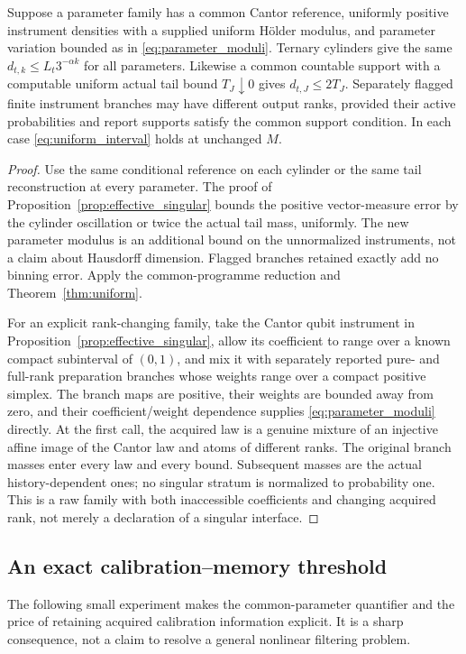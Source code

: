 \begin{corollary}\label{cor:uniform_singular}
Suppose a parameter family has a common Cantor reference, uniformly positive instrument densities with a supplied uniform H\"older modulus, and parameter variation bounded as in \eqref{eq:parameter_moduli}. Ternary cylinders give the same $d_{t,k}\le L_t3^{-\alpha k}$ for all parameters. Likewise a common countable support with a computable uniform actual tail bound $T_J\downarrow0$ gives $d_{t,J}\le2T_J$. Separately flagged finite instrument branches may have different output ranks, provided their active probabilities and report supports satisfy the common support condition. In each case \eqref{eq:uniform_interval} holds at unchanged $M$.
\end{corollary}
\begin{proof}
Use the same conditional reference on each cylinder or the same tail reconstruction at every parameter. The proof of Proposition~\ref{prop:effective_singular} bounds the positive vector-measure error by the cylinder oscillation or twice the actual tail mass, uniformly. The new parameter modulus is an additional bound on the unnormalized instruments, not a claim about Hausdorff dimension. Flagged branches retained exactly add no binning error. Apply the common-programme reduction and Theorem~\ref{thm:uniform}.

For an explicit rank-changing family, take the Cantor qubit instrument in Proposition~\ref{prop:effective_singular}, allow its coefficient to range over a known compact subinterval of $(0,1)$, and mix it with separately reported pure- and full-rank preparation branches whose weights range over a compact positive simplex. The branch maps are positive, their weights are bounded away from zero, and their coefficient/weight dependence supplies \eqref{eq:parameter_moduli} directly. At the first call, the acquired law is a genuine mixture of an injective affine image of the Cantor law and atoms of different ranks. The original branch masses enter every law and every bound. Subsequent masses are the actual history-dependent ones; no singular stratum is normalized to probability one. This is a raw family with both inaccessible coefficients and changing acquired rank, not merely a declaration of a singular interface.
\end{proof}

\subsection{An exact calibration--memory threshold}
The following small experiment makes the common-parameter quantifier and the price of retaining acquired calibration information explicit. It is a sharp consequence, not a claim to resolve a general nonlinear filtering problem.

